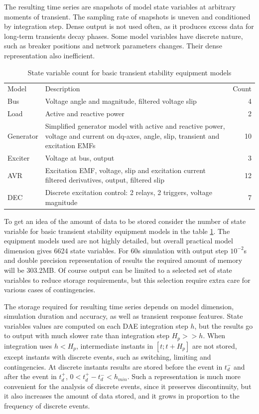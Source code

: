 \documentclass[lettersize,journal]{IEEEtran}
\begin{document}
The resulting time series are snapshots of model state variables at arbitrary moments of transient.
The sampling rate of snapshots is uneven and conditioned by integration step. Dense output is not used often, as it 
produces excess data for long-term transients decay phases. Some model variables have discrete nature, such
as breaker positions and network parameters changes. Their dense representation also inefficient.

\begin{table}[!h]
	\caption{State variable count for basic transient stability equipment models\label{tab:statvarscount}}
	\centering
	\begin{tabularx}{\columnwidth}{l|X|r}
		\hline
		Model & Description & Count\\
		\hlineB{3}	
		Bus & Voltage angle and magnitude, filtered voltage slip & 4\\
		\hline
		Load & Active and reactive power & 2\\
		\hline
		Generator & Simplified generator model with active and reactive power, voltage and current on dq-axes, 
		angle, slip, transient and excitation EMFs & 10\\
		\hline
		Exciter & Voltage at bus, output & 3\\
		\hline
		AVR & Excitation EMF, voltage, slip and excitation current filtered derivatives, output, filtered slip & 12\\
		\hline
		DEC & Discrete excitation control: 2 relays, 2 triggers, voltage magnitude & 7\\
		\hline
	\end{tabularx}
\end{table}

To get an idea of the amount of data to be stored consider the number of state variable for basic transient 
stability equipment models in the table \ref{tab:statvarscount}. The equipment models used are not 
highly detailed, but overall practical model dimension gives 6624 state variables. For 60s simulation with
output step \(10^{-2}\)s and double precision representation of results the required amount of memory will be 303.2MB.
Of course output can be limited to a selected set of state variables to reduce storage requirements,
but this selection require extra care for various cases of contingencies.

The storage required for resulting time series depends on model dimension, simulation duration
and accuracy, as well as transient response features. State variables values are computed on each DAE integration
step \(h\), but the results go to output with much slower rate than integration step \(H_p>>h\). 
When integration uses \(h<H_p\), intermediate instants in \([t;t+H_p]\) are not stored, except
instants with discrete events, such as switching, limiting and contingencies. At discrete instants
results are stored before the event in \(t_d^-\) and after the event in \(t_d^+\), \(0<t_d^+-t_d^-<h_{min}\).
Such a representation is much more convenient for the analysis of discrete events, since it preserves
discontinuity, but it also increases the amount of data stored, and it grows in proportion to the 
frequency of discrete events.
\end{document}
